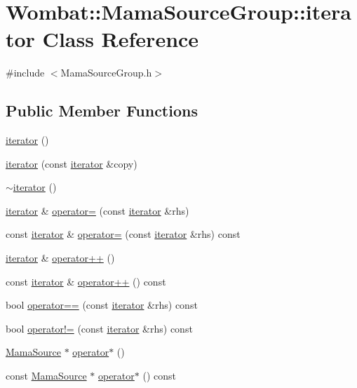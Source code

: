 \hypertarget{classWombat_1_1MamaSourceGroup_1_1iterator}{
\section{Wombat::MamaSourceGroup::iterator Class Reference}
\label{classWombat_1_1MamaSourceGroup_1_1iterator}
}


{\ttfamily \#include $<$MamaSourceGroup.h$>$}\subsection*{Public Member Functions}
\begin{DoxyCompactItemize}
\item 
\hyperlink{classWombat_1_1MamaSourceGroup_1_1iterator_aed54a3951d39b8527bbf2d7ada87612b}{iterator} ()
\item 
\hyperlink{classWombat_1_1MamaSourceGroup_1_1iterator_a59e193a9e699677c09583b1e8996e25a}{iterator} (const \hyperlink{classWombat_1_1MamaSourceGroup_1_1iterator}{iterator} \&copy)
\item 
\hyperlink{classWombat_1_1MamaSourceGroup_1_1iterator_a45898520df782e282f422711f914aa3a}{$\sim$iterator} ()
\item 
\hyperlink{classWombat_1_1MamaSourceGroup_1_1iterator}{iterator} \& \hyperlink{classWombat_1_1MamaSourceGroup_1_1iterator_a80c2ba6fb865b4b6275ac03613c258bb}{operator=} (const \hyperlink{classWombat_1_1MamaSourceGroup_1_1iterator}{iterator} \&rhs)
\item 
const \hyperlink{classWombat_1_1MamaSourceGroup_1_1iterator}{iterator} \& \hyperlink{classWombat_1_1MamaSourceGroup_1_1iterator_ad5a61e657b2d0d358d8ac882613b8098}{operator=} (const \hyperlink{classWombat_1_1MamaSourceGroup_1_1iterator}{iterator} \&rhs) const 
\item 
\hyperlink{classWombat_1_1MamaSourceGroup_1_1iterator}{iterator} \& \hyperlink{classWombat_1_1MamaSourceGroup_1_1iterator_afa0b25d05f910280f3a5771138dbc506}{operator++} ()
\item 
const \hyperlink{classWombat_1_1MamaSourceGroup_1_1iterator}{iterator} \& \hyperlink{classWombat_1_1MamaSourceGroup_1_1iterator_abd217f406cf17c3eee05a5438593a19e}{operator++} () const 
\item 
bool \hyperlink{classWombat_1_1MamaSourceGroup_1_1iterator_a426d12ceb5e2ba8c76285e72041ecb4c}{operator==} (const \hyperlink{classWombat_1_1MamaSourceGroup_1_1iterator}{iterator} \&rhs) const 
\item 
bool \hyperlink{classWombat_1_1MamaSourceGroup_1_1iterator_a7d0be19bddc33cecbebde437c1ac3096}{operator!=} (const \hyperlink{classWombat_1_1MamaSourceGroup_1_1iterator}{iterator} \&rhs) const 
\item 
\hyperlink{classWombat_1_1MamaSource}{MamaSource} $\ast$ \hyperlink{classWombat_1_1MamaSourceGroup_1_1iterator_a317fdd942273317dcb8b2d9c437b4a71}{operator$\ast$} ()
\item 
const \hyperlink{classWombat_1_1MamaSource}{MamaSource} $\ast$ \hyperlink{classWombat_1_1MamaSourceGroup_1_1iterator_a57631cba83189093445a9dc0e5b1b56d}{operator$\ast$} () const 
\end{DoxyCompactItemize}
